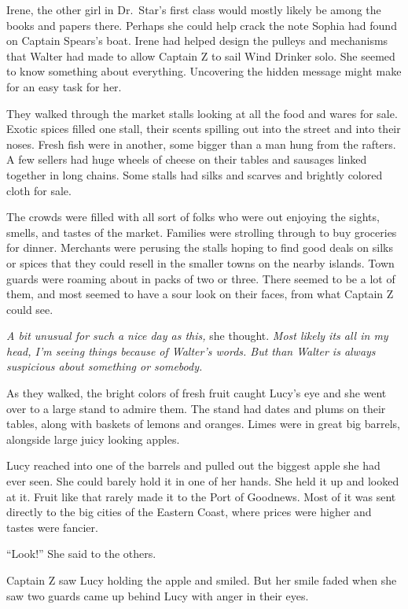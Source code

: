 \documentclass[12pt]{extbook}
\begin{document}
  Irene, the other girl in Dr.~Star's first class would mostly likely be
  among the books and papers there. Perhaps she could help crack the note
  Sophia had found on Captain Spears's boat. Irene had helped design the
  pulleys and mechanisms that Walter had made to allow Captain Z to sail
  Wind Drinker solo. She seemed to know something about everything.
  Uncovering the hidden message might make for an easy task for her.
  
  They walked through the market stalls looking at all the food and wares
  for sale. Exotic spices filled one stall, their scents spilling out into
  the street and into their noses. Fresh fish were in another, some bigger
  than a man hung from the rafters. A few sellers had huge wheels of
  cheese on their tables and sausages linked together in long chains. Some
  stalls had silks and scarves and brightly colored cloth for sale.
  
  The crowds were filled with all sort of folks who were out enjoying the
  sights, smells, and tastes of the market. Families were strolling
  through to buy groceries for dinner. Merchants were perusing the stalls
  hoping to find good deals on silks or spices that they could resell in
  the smaller towns on the nearby islands. Town guards were roaming about
  in packs of two or three. There seemed to be a lot of them, and most
  seemed to have a sour look on their faces, from what Captain Z could
  see.
  
  \emph{A bit unusual for such a nice day as this,} she thought.
  \emph{Most likely its all in my head, I'm seeing things because of
  Walter's words. But than Walter is always suspicious about something or
  somebody.}
  
  As they walked, the bright colors of fresh fruit caught Lucy's eye and
  she went over to a large stand to admire them. The stand had dates and
  plums on their tables, along with baskets of lemons and oranges. Limes
  were in great big barrels, alongside large juicy looking apples.
  
  Lucy reached into one of the barrels and pulled out the biggest apple
  she had ever seen. She could barely hold it in one of her hands. She
  held it up and looked at it. Fruit like that rarely made it to the Port
  of Goodnews. Most of it was sent directly to the big cities of the
  Eastern Coast, where prices were higher and tastes were fancier.
  
  \enquote{Look!} She said to the others.
  
  Captain Z saw Lucy holding the apple and smiled. But her smile faded
  when she saw two guards came up behind Lucy with anger in their eyes.
  
\end{document}
